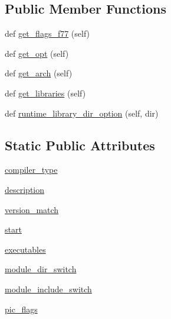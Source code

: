 \subsection*{Public Member Functions}
\begin{DoxyCompactItemize}
\item 
def \hyperlink{classnumpy_1_1distutils_1_1fcompiler_1_1sun_1_1SunFCompiler_af94a739db5f187725b748e891c062ac7}{get\+\_\+flags\+\_\+f77} (self)
\item 
def \hyperlink{classnumpy_1_1distutils_1_1fcompiler_1_1sun_1_1SunFCompiler_a7de01e7ec1854133038b9e79dca77889}{get\+\_\+opt} (self)
\item 
def \hyperlink{classnumpy_1_1distutils_1_1fcompiler_1_1sun_1_1SunFCompiler_a8e74d037f7adfbece7c70d1b779b3cb2}{get\+\_\+arch} (self)
\item 
def \hyperlink{classnumpy_1_1distutils_1_1fcompiler_1_1sun_1_1SunFCompiler_a8f7d8bf6bbbeee859b92aeee84a4c780}{get\+\_\+libraries} (self)
\item 
def \hyperlink{classnumpy_1_1distutils_1_1fcompiler_1_1sun_1_1SunFCompiler_a64e8d91ddd924adeff73106260f015be}{runtime\+\_\+library\+\_\+dir\+\_\+option} (self, dir)
\end{DoxyCompactItemize}
\subsection*{Static Public Attributes}
\begin{DoxyCompactItemize}
\item 
\hyperlink{classnumpy_1_1distutils_1_1fcompiler_1_1sun_1_1SunFCompiler_a4eaab4902a6e4347f4cc0d81ebedcfb9}{compiler\+\_\+type}
\item 
\hyperlink{classnumpy_1_1distutils_1_1fcompiler_1_1sun_1_1SunFCompiler_aeb8f956b3a2117937f0d56e9818e2153}{description}
\item 
\hyperlink{classnumpy_1_1distutils_1_1fcompiler_1_1sun_1_1SunFCompiler_a2617df7e8c939826ebe37f515cbe4338}{version\+\_\+match}
\item 
\hyperlink{classnumpy_1_1distutils_1_1fcompiler_1_1sun_1_1SunFCompiler_af6bf6f36c96a2ebb21d942be09a9ff3f}{start}
\item 
\hyperlink{classnumpy_1_1distutils_1_1fcompiler_1_1sun_1_1SunFCompiler_ad22314df9fe78fc11073d5b576bd059a}{executables}
\item 
\hyperlink{classnumpy_1_1distutils_1_1fcompiler_1_1sun_1_1SunFCompiler_acf41628dbbfcaac4154cc8d22129e0ca}{module\+\_\+dir\+\_\+switch}
\item 
\hyperlink{classnumpy_1_1distutils_1_1fcompiler_1_1sun_1_1SunFCompiler_a4383d47ba0bde85c4a4dda3b937629ad}{module\+\_\+include\+\_\+switch}
\item 
\hyperlink{classnumpy_1_1distutils_1_1fcompiler_1_1sun_1_1SunFCompiler_a10b260c86a57de0e29d1bf0568eab82d}{pic\+\_\+flags}
\end{DoxyCompactItemize}


